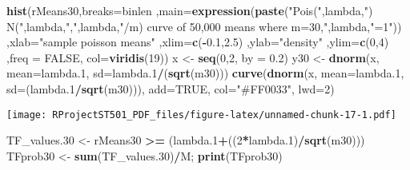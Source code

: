 \documentclass[
]{article}
\newenvironment{Shaded}{\begin{snugshade}}{\end{snugshade}}
\newcommand{\DataTypeTok}[1]{\textcolor[rgb]{0.13,0.29,0.53}{#1}}
\newcommand{\DecValTok}[1]{\textcolor[rgb]{0.00,0.00,0.81}{#1}}
\newcommand{\FloatTok}[1]{\textcolor[rgb]{0.00,0.00,0.81}{#1}}
\newcommand{\KeywordTok}[1]{\textcolor[rgb]{0.13,0.29,0.53}{\textbf{#1}}}
\newcommand{\NormalTok}[1]{#1}
\newcommand{\OperatorTok}[1]{\textcolor[rgb]{0.81,0.36,0.00}{\textbf{#1}}}
\newcommand{\OtherTok}[1]{\textcolor[rgb]{0.56,0.35,0.01}{#1}}
\newcommand{\StringTok}[1]{\textcolor[rgb]{0.31,0.60,0.02}{#1}}
\begin{document}
\begin{Shaded}
\begin{Highlighting}[]
\KeywordTok{hist}\NormalTok{(rMeans30,}\DataTypeTok{breaks=}\NormalTok{binlen ,}\DataTypeTok{main=}\KeywordTok{expression}\NormalTok{(}\KeywordTok{paste}\NormalTok{(}\StringTok{"Pois("}\NormalTok{,lambda,}\StringTok{") ~ N("}\NormalTok{,lambda,}\StringTok{","}\NormalTok{,lambda,}\StringTok{"/m) curve of 50,000 means where m=30,"}\NormalTok{,lambda,}\StringTok{"=1"}\NormalTok{))  ,}\DataTypeTok{xlab=}\StringTok{"sample poisson means"}\NormalTok{ ,}\DataTypeTok{xlim=}\KeywordTok{c}\NormalTok{(}\OperatorTok{-}\FloatTok{0.1}\NormalTok{,}\FloatTok{2.5}\NormalTok{) ,}\DataTypeTok{ylab=}\StringTok{"density"}\NormalTok{ ,}\DataTypeTok{ylim=}\KeywordTok{c}\NormalTok{(}\DecValTok{0}\NormalTok{,}\DecValTok{4}\NormalTok{) ,}\DataTypeTok{freq =} \OtherTok{FALSE}\NormalTok{, }\DataTypeTok{col=}\KeywordTok{viridis}\NormalTok{(}\DecValTok{19}\NormalTok{))}
\NormalTok{x <-}\StringTok{ }\KeywordTok{seq}\NormalTok{(}\DecValTok{0}\NormalTok{,}\DecValTok{2}\NormalTok{, }\DataTypeTok{by =} \FloatTok{0.2}\NormalTok{)}
\NormalTok{y30 <-}\StringTok{ }\KeywordTok{dnorm}\NormalTok{(x, }\DataTypeTok{mean=}\NormalTok{lambda}\FloatTok{.1}\NormalTok{, }\DataTypeTok{sd=}\NormalTok{lambda}\FloatTok{.1}\OperatorTok{/}\NormalTok{(}\KeywordTok{sqrt}\NormalTok{(m30)))}
\KeywordTok{curve}\NormalTok{(}\KeywordTok{dnorm}\NormalTok{(x, }\DataTypeTok{mean=}\NormalTok{lambda}\FloatTok{.1}\NormalTok{, }\DataTypeTok{sd=}\NormalTok{(lambda}\FloatTok{.1}\OperatorTok{/}\KeywordTok{sqrt}\NormalTok{(m30))), }\DataTypeTok{add=}\OtherTok{TRUE}\NormalTok{, }\DataTypeTok{col=}\StringTok{"#FF0033"}\NormalTok{, }\DataTypeTok{lwd=}\DecValTok{2}\NormalTok{)}
\end{Highlighting}
\end{Shaded}

\texttt{[image: RProjectST501\_PDF\_files/figure-latex/unnamed-chunk-17-1.pdf]}

\begin{Shaded}
\begin{Highlighting}[]
\NormalTok{TF_values}\FloatTok{.30}\NormalTok{ <-}\StringTok{ }\NormalTok{rMeans30 }\OperatorTok{>=}\StringTok{ }\NormalTok{(lambda}\FloatTok{.1}\OperatorTok{+}\NormalTok{((}\DecValTok{2}\OperatorTok{*}\NormalTok{lambda}\FloatTok{.1}\NormalTok{)}\OperatorTok{/}\KeywordTok{sqrt}\NormalTok{(m30)))}
\NormalTok{TFprob30 <-}\StringTok{ }\KeywordTok{sum}\NormalTok{(TF_values}\FloatTok{.30}\NormalTok{)}\OperatorTok{/}\NormalTok{M; }\KeywordTok{print}\NormalTok{(TFprob30)}
\end{Highlighting}
\end{Shaded}
\end{document}
